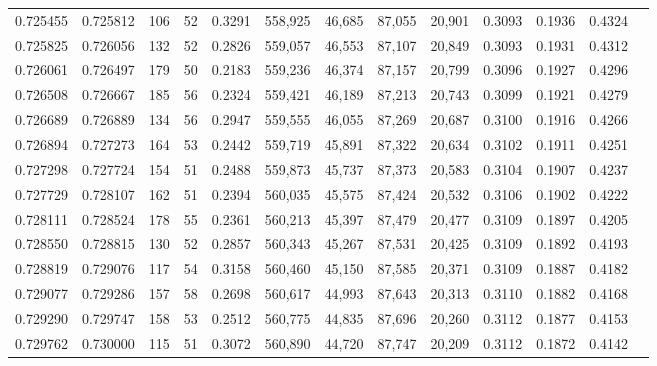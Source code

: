 \begin{tabular}{rrrrrrrrrrrrr}
0.725455 & 0.725812 &    106 &    52 &                                     0.3291 & 558,925 &  46,685 &  87,055 &  20,901 & 0.3093 & 0.1936 & 0.4324 \\
0.725825 & 0.726056 &    132 &    52 &                                     0.2826 & 559,057 &  46,553 &  87,107 &  20,849 & 0.3093 & 0.1931 & 0.4312 \\
0.726061 & 0.726497 &    179 &    50 &                                     0.2183 & 559,236 &  46,374 &  87,157 &  20,799 & 0.3096 & 0.1927 & 0.4296 \\
0.726508 & 0.726667 &    185 &    56 &                                     0.2324 & 559,421 &  46,189 &  87,213 &  20,743 & 0.3099 & 0.1921 & 0.4279 \\
0.726689 & 0.726889 &    134 &    56 &                                     0.2947 & 559,555 &  46,055 &  87,269 &  20,687 & 0.3100 & 0.1916 & 0.4266 \\
0.726894 & 0.727273 &    164 &    53 &                                     0.2442 & 559,719 &  45,891 &  87,322 &  20,634 & 0.3102 & 0.1911 & 0.4251 \\
0.727298 & 0.727724 &    154 &    51 &                                     0.2488 & 559,873 &  45,737 &  87,373 &  20,583 & 0.3104 & 0.1907 & 0.4237 \\
0.727729 & 0.728107 &    162 &    51 &                                     0.2394 & 560,035 &  45,575 &  87,424 &  20,532 & 0.3106 & 0.1902 & 0.4222 \\
0.728111 & 0.728524 &    178 &    55 &                                     0.2361 & 560,213 &  45,397 &  87,479 &  20,477 & 0.3109 & 0.1897 & 0.4205 \\
0.728550 & 0.728815 &    130 &    52 &                                     0.2857 & 560,343 &  45,267 &  87,531 &  20,425 & 0.3109 & 0.1892 & 0.4193 \\
0.728819 & 0.729076 &    117 &    54 &                                     0.3158 & 560,460 &  45,150 &  87,585 &  20,371 & 0.3109 & 0.1887 & 0.4182 \\
0.729077 & 0.729286 &    157 &    58 &                                     0.2698 & 560,617 &  44,993 &  87,643 &  20,313 & 0.3110 & 0.1882 & 0.4168 \\
0.729290 & 0.729747 &    158 &    53 &                                     0.2512 & 560,775 &  44,835 &  87,696 &  20,260 & 0.3112 & 0.1877 & 0.4153 \\
0.729762 & 0.730000 &    115 &    51 &                                     0.3072 & 560,890 &  44,720 &  87,747 &  20,209 & 0.3112 & 0.1872 & 0.4142 \\

\end{tabular}
